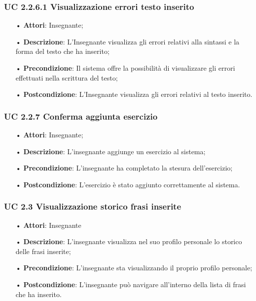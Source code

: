 \subsubsection{UC 2.2.6.1 Visualizzazione errori testo inserito}
\begin{itemize}
	\item[•] \textbf{Attori}: Insegnante;
	\item[•] \textbf{Descrizione}: L'Insegnante visualizza gli errori relativi alla sintassi e la forma del testo che ha inserito;
	\item[•] \textbf{Precondizione}: Il sistema offre la possibilità di visualizzare gli errori effettuati nella scrittura del testo;
	\item[•] \textbf{Postcondizione}: L’Insegnante visualizza gli errori relativi al testo inserito.
\end{itemize}

\subsubsection{UC 2.2.7 Conferma aggiunta esercizio}
\begin{itemize}
	\item[•] \textbf{Attori}: Insegnante;
	\item[•] \textbf{Descrizione}: L'insegnante aggiunge un esercizio al sistema;
	\item[•] \textbf{Precondizione}: L’insegnante ha completato la stesura dell'esercizio;
	\item[•] \textbf{Postcondizione}: L’esercizio è stato aggiunto correttamente al sistema.
\end{itemize}






\subsubsection{UC 2.3 Visualizzazione storico frasi inserite}


\begin{itemize}
	\item[•] \textbf{Attori}:  Insegnante	   
	\item[•] \textbf{Descrizione}: L’insegnante visualizza nel suo profilo personale lo storico delle frasi inserite; 
	\item[•] \textbf{Precondizione}: L'insegnante sta visualizzando il proprio profilo personale;
	\item[•] \textbf{Postcondizione}:  L’insegnante può navigare all’interno della lista di frasi che ha inserito.
\end{itemize}

